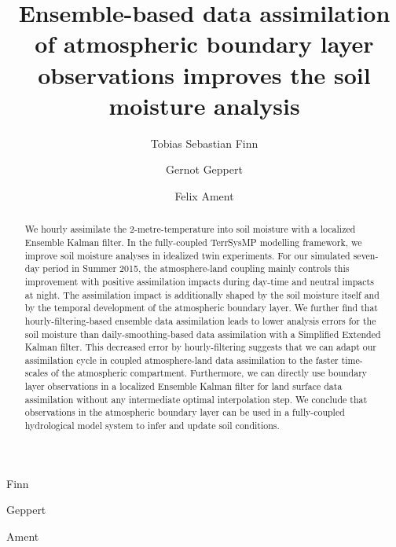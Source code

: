 \documentclass[hess, manuscript]{copernicus}
\begin{document}
\title{
	Ensemble-based data assimilation of atmospheric boundary layer observations improves the soil moisture analysis
}
\author[1,2,3]{Tobias Sebastian Finn}{Finn}
\author[4]{Gernot Geppert}{Geppert}
\author[1,5]{Felix Ament}{Ament}






%
%
%

\maketitle

\begin{abstract}
	We hourly assimilate the 2-metre-temperature into soil moisture with a localized Ensemble Kalman filter.
	In the fully-coupled TerrSysMP modelling framework, we improve soil moisture analyses in idealized twin experiments. For our simulated seven-day period in Summer 2015,
	the atmosphere-land coupling mainly controls this improvement with positive assimilation impacts during day-time and neutral impacts at night.
	The assimilation impact is additionally shaped by the soil moisture itself and by the temporal development of the atmospheric boundary layer.
	We further find that hourly-filtering-based ensemble data assimilation leads to lower analysis errors for the soil moisture than daily-smoothing-based data assimilation with a Simplified Extended Kalman filter.
	This decreased error by hourly-filtering suggests that we can adapt our assimilation cycle in coupled atmosphere-land data assimilation to the faster time-scales of the atmospheric compartment.
	Furthermore, we can directly use boundary layer observations in a localized Ensemble Kalman filter for land surface data assimilation without any intermediate optimal interpolation step.
	We conclude that observations in the atmospheric boundary layer can be used in a fully-coupled hydrological model system to infer and update soil conditions.
\end{abstract}
\end{document}
